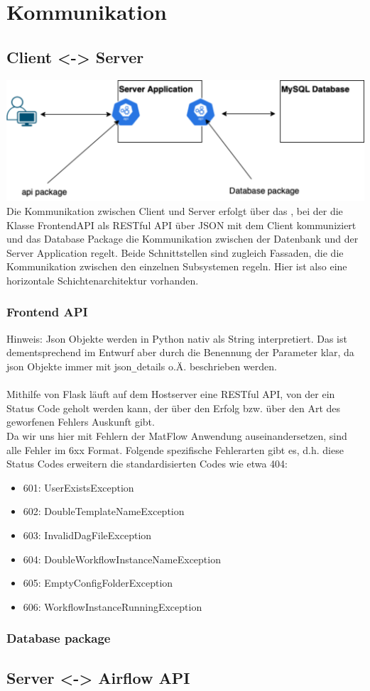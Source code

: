 \section{Kommunikation}

\subsection{Client <-> Server} 
\includegraphics[width=1\textwidth]{res/Kommunikation.png}
Die Kommunikation zwischen Client und Server erfolgt über das , bei der die Klasse FrontendAPI 
als RESTful API über JSON mit dem Client kommuniziert und das Database Package die Kommunikation 
zwischen der Datenbank und der Server Application regelt. Beide Schnittstellen sind zugleich Fassaden, die die Kommunikation
zwischen den einzelnen Subsystemen regeln.
Hier ist also eine horizontale Schichtenarchitektur vorhanden.

\subsubsection{Frontend API}
Hinweis: Json Objekte werden in Python nativ als String interpretiert. Das ist dementsprechend im Entwurf aber durch die 
Benennung der Parameter klar, da json Objekte immer mit json\texttt{\_}details o.Ä. beschrieben werden. \\ \\
Mithilfe von Flask läuft auf dem Hostserver eine RESTful API, von der ein Status Code geholt werden kann, der über den Erfolg 
bzw. über den Art des geworfenen Fehlers Auskunft gibt.\\ 
Da wir uns hier mit Fehlern der MatFlow Anwendung auseinandersetzen, sind alle Fehler im 6xx Format.
Folgende spezifische Fehlerarten gibt es, d.h. diese Status Codes erweitern die standardisierten Codes wie etwa 404:
\begin{itemize}
    \item 601: UserExistsException
    \item 602: DoubleTemplateNameException
    \item 603: InvalidDagFileException
    \item 604: DoubleWorkflowInstanceNameException
    \item 605: EmptyConfigFolderException
    \item 606: WorkflowInstanceRunningException
\end{itemize}

\subsubsection{Database package}
\subsection{Server <-> Airflow API}

\newpage